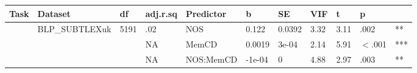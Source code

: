 \begin{table}[ht]
\centering
\begingroup\normalsize
\begin{tabular}{lllllllllll}
  \hline
Task & Dataset & df & adj.r.sq & Predictor & b & SE & VIF & t & p &  \\ 
  \hline
 & BLP\_SUBTLEXuk & 5191 & .02 & NOS & 0.122 & 0.0392 & 3.32 & 3.11 & .002 & ** \\ 
   &  &  & NA & MemCD & 0.0019 & 3e-04 & 2.14 & 5.91 & $<$.001 & *** \\ 
   &  &  & NA & NOS:MemCD & -1e-04 & 0 & 4.88 & 2.97 & .003 & ** \\ 
   \hline
\end{tabular}
\endgroup
\end{table}
